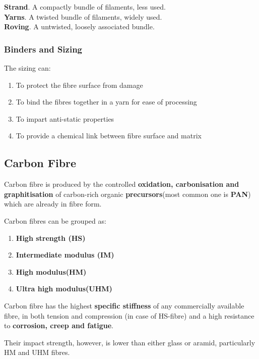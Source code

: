 \documentclass{NoteThesis/note-thesis}
\begin{document}
\begin{mynote_env}[frametitle=E-Glass Fibre Forms]
    \textbf{Strand}. A compactly bundle of filaments, less used.\\
    \textbf{Yarns}. A twisted bundle of filaments, widely used.\\
    \textbf{Roving}. A untwisted, loosely associated bundle.
\end{mynote_env}

\subsubsection*{Binders and Sizing}

The sizing can:

\begin{enumerate}
    \item To protect the fibre surface from damage
    \item To bind the fibres together in a yarn for ease of processing
    \item To impart anti-static properties
    \item To provide a chemical link between fibre surface and matrix
\end{enumerate}

\subsection{Carbon Fibre}

Carbon fibre is produced by the controlled \textbf{oxidation, carbonisation and graphitisation} of carbon-rich organic \textbf{precursors}(most common one is \textbf{PAN}) which are already in fibre form.

Carbon fibres can be grouped as:

\begin{enumerate}
    \item \textbf{High strength (HS)}
    \item \textbf{Intermediate modulus (IM)}
    \item \textbf{High modulus(HM)}
    \item \textbf{Ultra high modulus(UHM)}
\end{enumerate}

Carbon fibre has the highest \textbf{specific stiffness} of any commercially available fibre, in both tension and compression (in case of HS-fibre) and a high resistance to \textbf{corrosion, creep and fatigue}. 

Their impact strength, however, is lower than either glass or aramid, particularly HM and UHM fibres.
\end{document}
